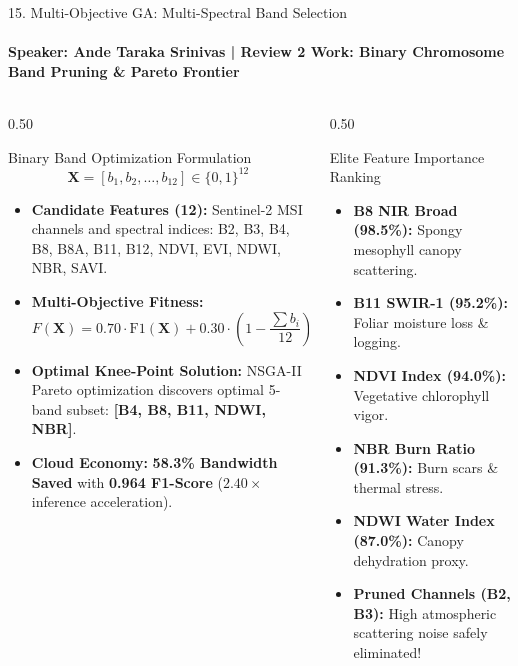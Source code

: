 \documentclass[aspectratio=169, 11pt]{beamer}
\let\oldcite\cite
\renewcommand{\cite}[1]{\hyperlink{ref:references_slide}{\textcolor{amritaMaroon}{\oldcite{#1}}}}
\begin{document}
\begin{frame}{15. Multi-Objective GA: Multi-Spectral Band Selection}
    \framesubtitle{\textbf{\textcolor{amritaGold}{Speaker: Ande Taraka Srinivas}} \quad | \quad Review 2 Work: Binary Chromosome Band Pruning \& Pareto Frontier}
    \begin{columns}[c]
        \begin{column}{0.50\textwidth}
            \begin{block}{Binary Band Optimization Formulation}
                \footnotesize
                $$\mathbf{X} = [b_1, b_2, \dots, b_{12}] \in \{0, 1\}^{12}$$
                \begin{itemize}
                    \item \textbf{Candidate Features (12):} Sentinel-2 MSI channels \cite{drusch2012sentinel} and spectral indices: B2, B3, B4, B8, B8A, B11, B12, NDVI, EVI, NDWI, NBR, SAVI.
                    \item \textbf{Multi-Objective Fitness:}
                    $$F(\mathbf{X}) = 0.70 \cdot \text{F1}(\mathbf{X}) + 0.30 \cdot \left(1 - \frac{\sum b_i}{12}\right) - \text{Penalty}$$
                    \item \textbf{Optimal Knee-Point Solution:} NSGA-II Pareto optimization \cite{deb2002fast} discovers optimal 5-band subset: \textbf{[B4, B8, B11, NDWI, NBR]}.
                    \item \textbf{Cloud Economy:} \textbf{58.3\% Bandwidth Saved} with \textbf{0.964 F1-Score} ($2.40\times$ inference acceleration).
                \end{itemize}
            \end{block}
        \end{column}
        \begin{column}{0.50\textwidth}
            \begin{exampleblock}{Elite Feature Importance Ranking}
                \footnotesize
                \begin{itemize}
                    \item \textbf{B8 NIR Broad (98.5\%):} Spongy mesophyll canopy scattering.
                    \item \textbf{B11 SWIR-1 (95.2\%):} Foliar moisture loss \& logging.
                    \item \textbf{NDVI Index (94.0\%):} Vegetative chlorophyll vigor.
                    \item \textbf{NBR Burn Ratio (91.3\%):} Burn scars \& thermal stress.
                    \item \textbf{NDWI Water Index (87.0\%):} Canopy dehydration proxy.
                    \item \textbf{Pruned Channels (B2, B3):} High atmospheric scattering noise safely eliminated!
                \end{itemize}
            \end{exampleblock}
        \end{column}
    \end{columns}
\end{frame}
\end{document}
